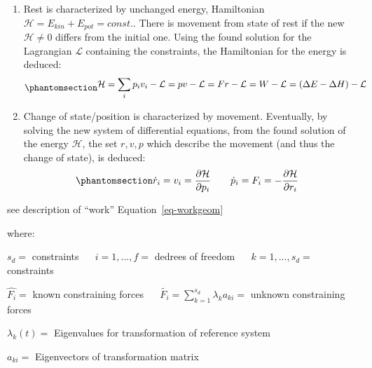 \documentclass[
  letterpaper,
  DIV=11,
  numbers=noendperiod]{scrartcl}
\begin{document}
\begin{enumerate}
  and at same time solving for constraining conditions that hold the
  system at rest (equilibrium):
  \begin{equation}\phantomsection\label{eq-constraincondition}{\begin{split} &
  \sum_{l=1}^f a_{kl} v_l + b_k = 0
  \end{split}}\end{equation}
\item
  Rest is characterized by unchanged energy, Hamiltonian
  \(\mathcal{H} = E_{kin} + E_{pot} = const.\). There is movement from
  state of rest if the new \(\mathcal{H} \neq 0\) differs from the
  initial one. Using the found solution for the Lagrangian
  \(\mathcal{L}\) containing the constraints, the Hamiltonian for the
  energy is deduced:
  \begin{equation}\phantomsection\label{eq-hamiltonian}{\begin{split} &
  \mathcal{H} = \sum_i p_i v_i - \mathcal{L} = pv - \mathcal{L}  = Fr - \mathcal{L} = W - \mathcal{L}  = (\Delta E - \Delta H) - \mathcal{L}
  \end{split}}\end{equation}
\item
  Change of state/position is characterized by movement. Eventually, by
  solving the new system of differential equations, from the found
  solution of the energy \(\mathcal{H}\), the set \({r,v,p}\) which
  describe the movement (and thus the change of state), is deduced:
  \begin{equation}\phantomsection\label{eq-movement}{\begin{split} &
  \dot r_i = v_i = \frac{\partial\mathcal{H}}{\partial p_i}   \qquad
  \dot p_i = F_i = - \frac{\partial\mathcal{H}}{\partial r_i}
  \end{split}}\end{equation}
\end{enumerate}

see description of ``work'' Equation~\ref{eq-workgeom}

where:

\(s_d =\) constraints   \(i = 1,...,f =\) dedrees of freedom  
\(k = 1,...,s_d =\) constraints

\(\hat{F_i} =\) known constraining forces  
\(\tilde{F_i} = \sum_{k=1}^{s_d} \lambda_k a_{ki} =\) unknown
constraining forces

\(\lambda_k(t) =\) Eigenvalues for transformation of reference system

\(a_{ki} =\) Eigenvectors of transformation matrix
\end{document}
